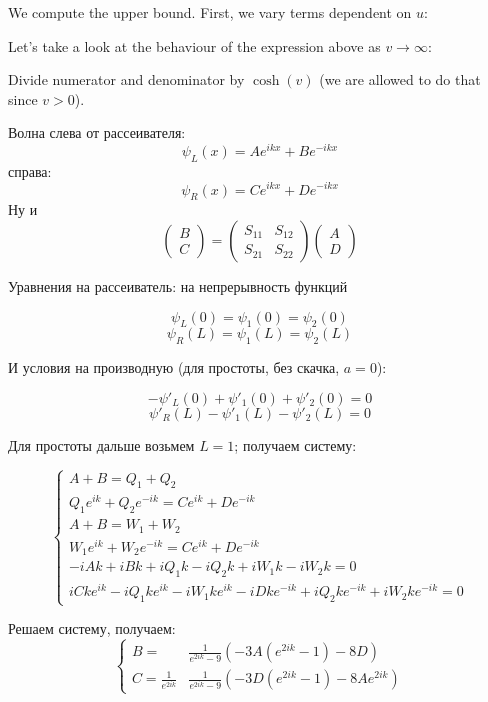 We compute the upper bound. First, we vary terms dependent on $u$:


Let's take a look at the behaviour of the expression above as $v \to \infty$:

Divide numerator and denominator by $\cosh(v)$ (we are allowed to do that since $v > 0$).


Волна слева от рассеивателя:
\[
\psi_L(x) = A e^{i k x} + B e^{-i k x}
\]
справа:
\[
\psi_R(x) = C e^{i k x} + D e^{-i k x}
\]
Ну и
\[
\begin{pmatrix}B \\ C \end{pmatrix} = \begin{pmatrix} S_{11} & S_{12} \\ S_{21} & S_{22} \end{pmatrix}\begin{pmatrix} A \\ D \end{pmatrix}
\]


Уравнения на рассеиватель: на непрерывность функций

\[
\psi_L(0) = \psi_1(0) = \psi_2(0)
\]
\[
\psi_R(L) = \psi_1(L) = \psi_2(L)
\]

И условия на производную (для простоты, без скачка, $a=0$):

\[
-\psi'_L(0) + \psi'_1(0) + \psi'_2(0) = 0
\]
\[
\psi'_R(L) - \psi'_1(L) - \psi'_2(L) = 0
\]

Для простоты дальше возьмем $L=1$; получаем систему:

\[
\begin{cases}
A + B = Q_1 + Q_2 \\
Q_1 e^{i k} + Q_2 e^{-i k} = C e^{i k} + D e^{-i k} \\
A + B = W_1 + W_2 \\
W_1 e^{i k} + W_2 e^{-i k} = C e^{i k} + D e^{-i k} \\
-i A k + i B k + i Q_1 k - i Q_2 k + i W_1 k - i W_2 k = 0 \\
i C k e^{i k} - i Q_1 k e^{i k} - i W_1 k e^{i k} - i D k e^{-i k} + i Q_2 k e^{-i k} + i W_2 k e^{-i k} = 0
\end{cases}
\]

Решаем систему, получаем:
\[
\begin{cases}
B =                     & \frac{1}{e^{2 i k} - 9} ( -3 A (e^{2 i k} - 1) - 8 D ) \\ 
C = \frac{1}{e^{2 i k}} & \frac{1}{e^{2 i k} - 9} ( -3 D (e^{2 i k} - 1) - 8 A e^{2 i k} ) 
\end{cases}
\]

